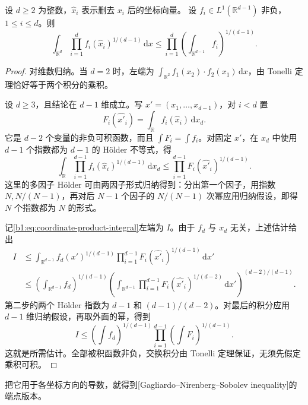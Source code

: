 \begin{lemma}\label{b1:lem:coordinate-product-integral}
设 \(d\geq2\) 为整数，\(\widehat x_i\) 表示删去 \(x_i\) 后的坐标向量。
设 \(f_i\in L^1(\mathbb R^{d-1})\) 非负，\(1\leq i\leq d\)。则
\begin{equation}\label{b1:eq:coordinate-product-integral}
 \int_{\mathbb R^d}\prod_{i=1}^d
          f_i(\widehat{x}_i)^{1/(d-1)}\,\mathrm dx
 \leq\prod_{i=1}^d
          \left(\int_{\mathbb R^{d-1}}f_i\right)^{1/(d-1)}.
\end{equation}
\end{lemma}
\begin{proof}
对维数归纳。当 \(d=2\) 时，左端为
\(\int_{\mathbb R^2}f_1(x_2)\cdot f_2(x_1)\,\mathrm dx\)，由 Tonelli 定理恰好等于两个积分的乘积。

设 \(d\geq3\)，且结论在 \(d-1\) 维成立。写 \(x'=(x_1,\ldots,x_{d-1})\)，对 \(i<d\) 置
\[
 F_i(\widehat{x'}_i)=\int_{\mathbb R}f_i(\widehat{x}_i)\,\mathrm dx_d.
\]
它是 \(d-2\) 个变量的非负可积函数，而且
\(\int F_i=\int f_i\)。对固定 \(x'\)，在 \(x_d\) 中使用 \(d-1\) 个指数都为 \(d-1\) 的 Hölder 不等式，得
\[
 \int_{\mathbb R}\prod_{i=1}^{d-1}
       f_i(\widehat{x}_i)^{1/(d-1)}\,\mathrm dx_d
 \leq\prod_{i=1}^{d-1}
       F_i(\widehat{x'}_i)^{1/(d-1)}.
\]
这里的多因子 Hölder 可由两因子形式归纳得到：分出第一个因子，用指数 \(N,N/(N-1)\)，再对后 \(N-1\) 个因子的 \(N/(N-1)\) 次幂应用归纳假设，即得 \(N\) 个指数都为 \(N\) 的形式。

记\eqref{b1:eq:coordinate-product-integral}左端为 \(I\)。由于 \(f_d\) 与 \(x_d\) 无关，上述估计给出
\[
 \begin{aligned}
 I
 &\leq\int_{\mathbb R^{d-1}}f_d(x')^{1/(d-1)}
             \prod_{i=1}^{d-1}F_i(\widehat{x'}_i)^{1/(d-1)}\,\mathrm dx'\\
 &\leq\left(\int_{\mathbb R^{d-1}}f_d\right)^{1/(d-1)}
       \left(\int_{\mathbb R^{d-1}}
             \prod_{i=1}^{d-1}F_i(\widehat{x'}_i)^{1/(d-2)}
             \,\mathrm dx'\right)^{(d-2)/(d-1)}.
 \end{aligned}
\]
第二步的两个 Hölder 指数为 \(d-1\) 和 \((d-1)/(d-2)\)。对最后的积分应用 \(d-1\) 维归纳假设，再取外面的幂，得到
\[
 I\leq\left(\int f_d\right)^{1/(d-1)}
             \prod_{i=1}^{d-1}\left(\int F_i\right)^{1/(d-1)}.
\]
这就是所需估计。全部被积函数非负，交换积分由 Tonelli 定理保证，无须先假定乘积可积。
\end{proof}

把它用于各坐标方向的导数，就得到[Gagliardo--Nirenberg--Sobolev inequality]的端点版本。

